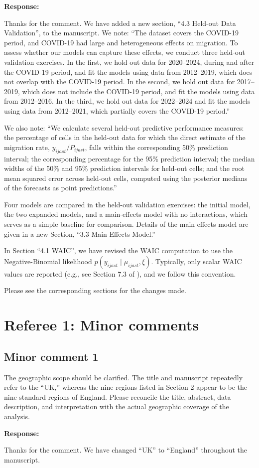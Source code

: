\documentclass[11pt,a4paper]{article}
\newlength{\replyspace}
\newenvironment{response}{\par\addvspace{\replyspace}\nopagebreak\textbf{\textcolor{replyblue}{Response:}}\par\begingroup\color{replyblue}}{\par\endgroup\vspace{\replyspace}}
\newcommand{\refcomment}[2]{\par\Needspace{5\baselineskip}\subsection*{#1}#2\par}
\begin{document}
\begin{response}
Thanks for the comment. We have added a new section, ``4.3 Held-out Data Validation'', to the manuscript. We note: ``The dataset covers the COVID-19 period, and COVID-19 had large and heterogeneous effects on migration. To assess whether our models can capture these effects, we conduct three held-out validation exercises. In the first, we hold out data for 2020–2024, during and after the COVID-19 period, and fit the models using data from 2012–2019, which does not overlap with the COVID-19 period. In the second, we hold out data for 2017–2019, which does not include the COVID-19 period, and fit the models using data from 2012–2016. In the third, we hold out data for 2022–2024 and fit the models using data from 2012–2021, which partially covers the COVID-19 period.''

We also note: ``We calculate several held-out predictive performance measures: the percentage of cells in the held-out data for which the direct estimate of the migration rate, 
$y_{ijast}/P_{ijast}$, falls within the corresponding 50\% prediction interval; the corresponding percentage for the 95\% prediction interval; the median widths of the 50\% and 95\% prediction intervals for held-out cells; and the root mean squared error across held-out cells, computed using the posterior medians of the forecasts as point predictions.''

Four models are compared in the held-out validation exercises: the initial model, the two expanded models, and a main-effects model with no interactions, which serves as a simple baseline for comparison. Details of the main effects model are given in a new Section, ``3.3 Main Effects Model.''

In Section ``4.1 WAIC'', we have revised the WAIC computation to use the Negative-Binomial likelihood $p(y_{ijast}\mid\mu_{ijast},\xi)$. Typically, only scalar WAIC values are reported (e.g., see Section 7.3 of \citet{Gelman2014bayesian}), and we follow this convention.

Please see the corresponding sections for the changes made.
\end{response}

\section*{Referee 1: Minor comments}
\refcomment{Minor comment 1}{
The geographic scope should be clarified. The title and manuscript repeatedly refer to the ``UK,'' whereas the nine regions listed in Section 2 appear to be the nine standard regions of England. Please reconcile the title, abstract, data description, and interpretation with the actual geographic coverage of the analysis.
}
\begin{response}
Thanks for the comment. We have changed ``UK'' to ``England'' throughout the manuscript.
\end{response}
\end{document}
